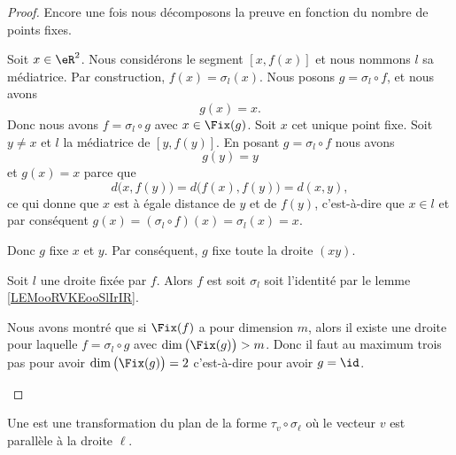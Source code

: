 \begin{proof}
	Encore une fois nous décomposons la preuve en fonction du nombre de points fixes.
	\begin{subproof}
		Soit \( x\in \eR^2\). Nous considérons le segment \( [x,f(x)]\) et nous nommons \( l\) sa médiatrice. Par construction, \( f(x)=\sigma_l(x)\). Nous posons \( g=\sigma_l\circ f\), et nous avons
		\begin{equation}
			g(x)=x.
		\end{equation}
		Donc nous avons \( f=\sigma_l\circ g\) avec \( x\in\Fix(g)\).
		Soit \( x\) cet unique point fixe. Soit \( y\neq x\) et \( l\) la médiatrice de \( [y,f(y)]\). En posant \( g=\sigma_l\circ f\) nous avons
		\begin{equation}
			g(y)=y
		\end{equation}
		et \( g(x)=x\) parce que
		\begin{equation}
			d\big( x,f(y) \big)=d\big( f(x),f(y) \big)=d(x,y),
		\end{equation}
		ce qui donne que \( x\) est à égale distance de \( y\) et de \( f(y)\), c'est-à-dire que \( x\in l\) et par conséquent \( g(x)=(\sigma_l\circ f)(x)=\sigma_l(x)=x\).

		Donc \( g\) fixe \( x\) et \( y\). Par conséquent, \( g\) fixe toute la droite \( (xy)\).

		Soit \( l\) une droite fixée par \( f\). Alors \( f\) est soit \( \sigma_l\) soit l'identité par le lemme \ref{LEMooRVKEooSlIrIR}.

		\spitem[Conclusion]
		Nous avons montré que si \( \Fix(f)\) a pour dimension \( m\), alors il existe une droite pour laquelle \( f=\sigma_l\circ g\) avec \( \dim\big( \Fix(g) \big)>m\). Donc il faut au maximum trois pas pour avoir \( \dim\big( \Fix(g) \big)=2\) c'est-à-dire pour avoir \( g=\id\).
	\end{subproof}
\end{proof}

\begin{definition}      \label{DEFooJEOYooNwYtuQ}
	Une  est une transformation du plan de la forme \( \tau_v\circ\sigma_{\ell}\) où le vecteur \( v\) est parallèle à la droite \( \ell\).
\end{definition}

